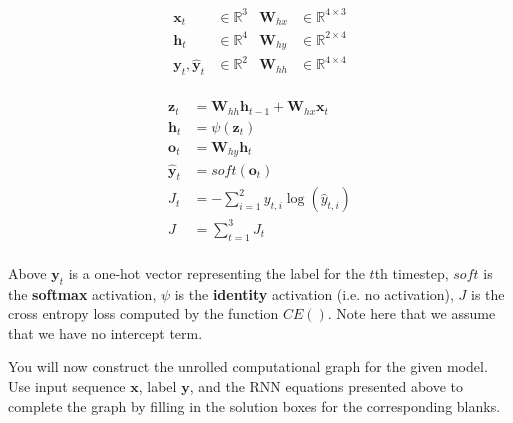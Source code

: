 \documentclass[11pt,addpoints,answers]{exam}
\newcommand{\hv}{\mathbf{h}}
\newcommand{\ov}{\mathbf{o}}
\newcommand{\xv}{\mathbf{x}}
\newcommand{\yv}{\mathbf{y}}
\newcommand{\zv}{\mathbf{z}}
\newcommand{\Wv}{\mathbf{W}}
\begin{document}
\begin{questions}
\begin{parts}
\begin{minipage}{0.5\linewidth}
\begin{align*}
    \xv_t &\in \mathbb{R}^3 &\Wv_{hx} &\in \mathbb{R}^{4 \times 3}\\
    \hv_t &\in \mathbb{R}^4 &\Wv_{hy} &\in \mathbb{R}^{2 \times 4}\\
    \yv_t, \hat{\yv}_t &\in \mathbb{R}^2 &\Wv_{hh} &\in \mathbb{R}^{4 \times 4}\\
\end{align*}
\end{minipage}
\begin{minipage}{0.5\linewidth}    
\begin{align*}
    \zv_t &= \Wv_{hh} \hv_{t-1} + \Wv_{hx}\xv_t\\
    \hv_t &= \psi(\zv_t)\\
    \ov_t &= \Wv_{hy}\hv_t\\
    \hat{\yv}_t &= soft(\ov_t)\\
    J_t &= -\sum_{i=1}^2 y_{t,i} \log(\hat{y}_{t,i})\\
    J &= \sum_{t=1}^3 J_t\\
\end{align*}
\end{minipage}

Above $\yv_t$ is a one-hot vector representing the label for the $t$th timestep, $soft$ is the \textbf{softmax} activation, $\psi$ is the \textbf{identity} activation (i.e. no activation), $J$ is the cross entropy loss computed by the function $CE()$. Note here that we assume that we have no intercept term. 

\begin{subparts}

\clearpage
    \subpart[4] You will now construct the unrolled computational graph for the given model.
    Use input sequence $\xv$, label $\yv$, and the RNN equations presented above to complete the graph by filling in the solution boxes for the corresponding blanks.\\


\end{subparts}
\end{parts}
\end{questions}
\end{document}
